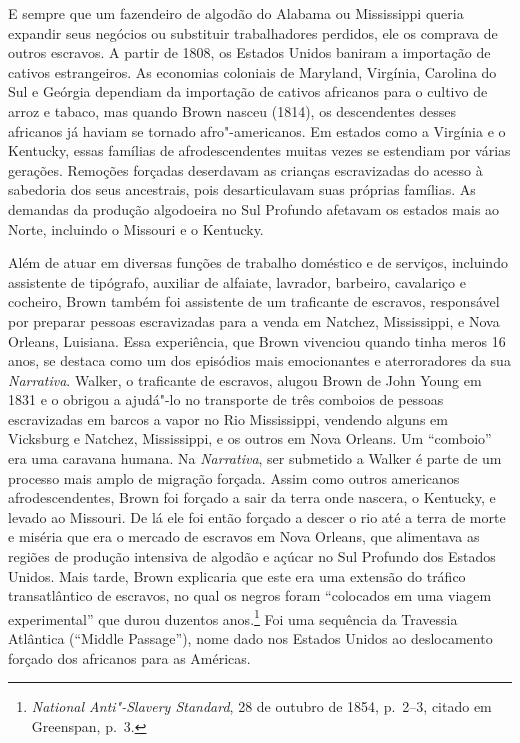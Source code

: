 E sempre que um fazendeiro de algodão do Alabama ou Mississippi queria
expandir seus negócios ou substituir trabalhadores perdidos, ele os
comprava de outros escravos. A partir de 1808, os Estados Unidos baniram
a importação de cativos estrangeiros. As economias coloniais de
Maryland, Virgínia, Carolina do Sul e Geórgia dependiam da importação de
cativos africanos para o cultivo de arroz e tabaco, mas quando Brown
nasceu (1814), os descendentes desses africanos já haviam se tornado
afro"-americanos. Em estados como a Virgínia e o Kentucky, essas famílias
de afrodescendentes muitas vezes se estendiam por várias gerações.
Remoções forçadas deserdavam as crianças escravizadas do acesso à
sabedoria dos seus ancestrais, pois desarticulavam suas próprias
famílias. As demandas da produção algodoeira no Sul Profundo afetavam os
estados mais ao Norte, incluindo o Missouri e o Kentucky.

Além de atuar em diversas funções de trabalho doméstico e de serviços,
incluindo assistente de tipógrafo, auxiliar de alfaiate, lavrador,
barbeiro, cavalariço e cocheiro, Brown também foi assistente de um
traficante de escravos, responsável por preparar pessoas escravizadas
para a venda em Natchez, Mississippi, e Nova Orleans, Luisiana. Essa
experiência, que Brown vivenciou quando tinha meros 16 anos, se destaca
como um dos episódios mais emocionantes e aterroradores da sua
\emph{Narrativa}. Walker, o traficante de escravos, alugou Brown de John
Young em 1831 e o obrigou a ajudá"-lo no transporte de três comboios de
pessoas escravizadas em barcos a vapor no Rio Mississippi, vendendo
alguns em Vicksburg e Natchez, Mississippi, e os outros em Nova Orleans.
Um ``comboio'' era uma caravana humana. Na \emph{Narrativa}, ser
submetido a Walker é parte de um processo mais amplo de migração
forçada. Assim como outros americanos afrodescendentes, Brown foi
forçado a sair da terra onde nascera, o Kentucky, e levado ao Missouri.
De lá ele foi então forçado a descer o rio até a terra de morte e
miséria que era o mercado de escravos em Nova Orleans, que alimentava as
regiões de produção intensiva de algodão e açúcar no Sul Profundo dos
Estados Unidos. Mais tarde, Brown explicaria que este era uma extensão
do tráfico transatlântico de escravos, no qual os negros foram
``colocados em uma viagem experimental'' que durou duzentos
anos.\footnote{\emph{National Anti"-Slavery Standard}, 28 de outubro de
  1854, p.~2--3, citado em Greenspan, p.~3.} Foi uma sequência da Travessia
Atlântica (``Middle Passage''), nome dado nos Estados Unidos ao
deslocamento forçado dos africanos para as Américas.

